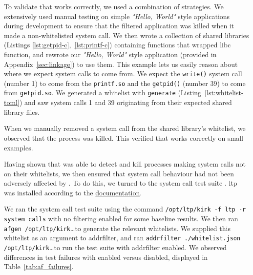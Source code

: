 To validate that \af works correctly, we used a combination of strategies. We 
extensively used manual testing on simple \textit{"Hello, World"} style 
applications during development to ensure that the filtered application was 
killed when it made a non-whitelisted system call. We then wrote a collection of 
shared libraries (Listings \ref{lst:getpid-c},~\ref{lst:printf-c}) containing 
functions that wrapped \ac{libc} function, and rewrote our 
\textit{"Hello, World"} style application (provided in Appendix~\ref{sec:linkage})
to use them. This example lets us easily reason about where we expect system calls
to come from. We expect the \texttt{write()} system call (number 1) to come from 
the \texttt{printf.so} and the \texttt{getpid()} (number 39) to come from 
\texttt{getpid.so}. We generated a whitelist with \af \texttt{generate} 
(Listing~\ref{lst:whitelist-toml}) and saw system calls 1 and 39 originating from
their expected shared library files.

When we manually removed a system call from the shared library's whitelist, we 
observed that the process was killed. This  verified that \af works correctly
on small examples.

Having shown that \af was able to detect and kill processes making system calls not
on their whitelists, we then ensured that system call behaviour had not been 
adversely affected by \af. To do this, we turned to the  system call test 
suite \cite{LINUX_TEST_PROJECT}. \ac{ltp} was installed according to the
\href{https://linux-test-project.readthedocs.io/en/latest/users/quick_start.html}{documentation}.

We ran the system call test suite using the command \texttt{/opt/ltp/kirk -f ltp -r
system calls} with no filtering enabled for some baseline results. We then ran
\texttt{afgen /opt/ltp/kirk}\dots to generate the relevant
whitelists. We supplied this whitelist as an argument to addrfilter, and ran
\texttt{addrfilter ./whitelist.json /opt/ltp/kirk}\dots to run the test suite
with addrfilter enabled. We observed differences in test failures with \af
enabled versus disabled, displayed in Table~\ref{tab:af_failures}.

